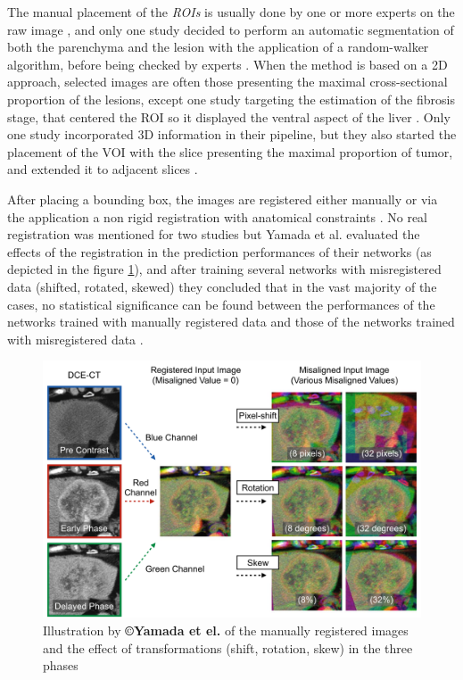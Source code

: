\documentclass[]{article}
\begin{document}
The manual placement of the \emph{ROIs} is usually done by one or more
experts on the raw image \cite{Yamada2019,Wang2018,Yasaka2018a,Yasaka2018,WANG2019}, and only
one study decided to perform an automatic segmentation of both the
parenchyma and the lesion with the application of a random-walker
algorithm, before being checked by experts \cite{Liang2018}. When the method is based on a 2D approach, selected images are
often those presenting the maximal cross-sectional proportion of the
lesions, except one study targeting the estimation of the fibrosis
stage, that centered the ROI so it displayed the ventral aspect
of the liver \cite{Yasaka2018a}. Only one study
incorporated 3D information in their pipeline, but they also started the
placement of the VOI with the slice presenting the maximal
proportion of tumor, and extended it to adjacent slices \cite{Yang2019}.

After placing a bounding box, the images are registered either manually \cite{Yamada2019,WANG2019,Wang2018} or
via the application a non rigid registration with anatomical constraints \cite{Liang2018}. No real registration was mentioned for
two studies \cite{Peng2020,Yasaka2018a} but
Yamada et al. evaluated the effects of the registration in the
prediction performances of their networks (as depicted in the figure \ref{Yamada2019_Fig1}), and after training several networks with misregistered data
(shifted, rotated, skewed) they concluded that in the vast majority of
the cases, no statistical significance can be found between the
performances of the networks trained with manually registered data and
those of the networks trained with misregistered data \cite{Yamada2019}.


\begin{figure}[th!]
\centering
\includegraphics[width=0.7\linewidth]{images/image12}
\caption{Illustration by \textbf{©Yamada et el.} of the manually registered images and the effect of transformations (shift, rotation, skew) in the three phases \cite{Yamada2019}}
\label{Yamada2019_Fig1}
\end{figure}
\end{document}
